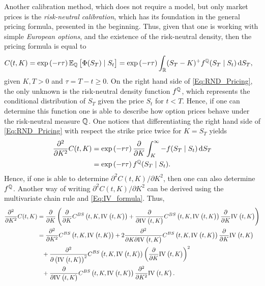 Another calibration method, which does not require a model, but only market prices is the \emph{risk-neutral calibration}, which has its foundation in the general pricing formula, presented in the beginning. Thus, given that one is working with simple \emph{European options}, and the existence of the risk-neutral density, then the pricing formula is equal to
\begin{align}\label{Eq:RND_Pricing}
    C(t,K) &= \exp\left(-r\tau\right)\E[\Q]{\Phi(S_T)\mid S_t} = \exp\left(-r\tau\right)\int_\R(S_T-K)^+f^\Q(S_T\mid S_t)\,\mathrm{d}S_T,
\end{align}
given $K,T>0$ and $\tau=T-t\geq0$. On the right hand side of \eqref{Eq:RND_Pricing}, the only unknown is the risk-neutral density function $f^{\mathbb{Q}}$, which represents the conditional distribution of $S_T$ given the price $S_t$ for $t<T$. Hence, if one can determine this function one is able to describe how option prices behave under the risk-neutral measure $\mathbb{Q}$. One notices that differentiating the right hand side of \eqref{Eq:RND_Pricing} with respect the strike price twice for $K=S_T$ yields
\begin{align}\begin{aligned}\label{Eq:PartialC}
    \frac{\partial^2}{\partial K^2}C(t,K) &= \exp\left(-r\tau\right)\frac{\partial}{\partial K}\int_K^\infty -f(S_T\mid S_t)\,\mathrm{d}S_T\\
    &=\exp\left(-r\tau\right)f^{\mathbb{Q}}(S_T\mid S_t).
\end{aligned}\end{align}
Hence, if one is able to determine $\partial^2C(t,K)/\partial K^2$, then one can also determine $f^{\mathbb{Q}}$. Another way of writing $\partial^2C(t,K)/\partial K^2$ can be derived using the multivariate chain rule and \eqref{Eq:IV_formula}. Thus,
\begin{align}\begin{split}\label{Eq:RND_Derivatives}
    \frac{\partial^2}{\partial K^2} C(t,K) &= \frac{\partial}{\partial K}\left(\frac{\partial}{\partial K} C^{BS}\left(t,K,\IV{t,K}\right) + \frac{\partial}{\partial\IV{t,K}} C^{BS}\left(t,K,\IV{t,K}\right)\frac{\partial}{\partial K}\IV{t,K}\right)\\
    &= \frac{\partial^2}{\partial K^2}C^{BS}\left(t,K,\IV{t,K}\right)+2\frac{\partial^2}{\partial K\partial\IV{t,K}}C^{BS}\left(t,K,\IV{t,K}\right)\frac{\partial}{\partial K}\IV{t,K}\\
    &\phantom{=} +\frac{\partial^2}{\partial\left(\IV{t,K}\right)^2}C^{BS}\left(t,K,\IV{t,K}\right)\left(\frac{\partial}{\partial K}\IV{t,K}\right)^2\\&\phantom{=} +\frac{\partial}{\partial\IV{t,K}}C^{BS}\left(t,K,\IV{t,K}\right)\frac{\partial^2}{\partial K^2}\IV{t,K}.
\end{split}\end{align}
